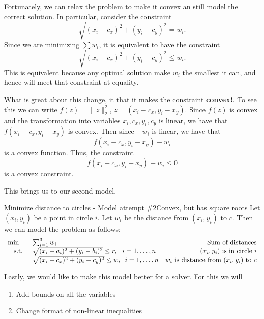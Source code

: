 Fortunately, we can relax the problem to make it convex an still model the correct solution.  In particular, consider the constraint 
$$
 \sqrt{(x_i - c_x)^2 + (y_i - c_y)^2} = w_i .
$$
Since we are minimizing $\sum w_i$, it is equivalent to have the constraint
$$
 \sqrt{(x_i - c_x)^2 + (y_i - c_y)^2} \leq w_i.
$$
This is equivalent because any optimal solution make $w_i$ the smallest it can, and hence will meet that constraint at equality.  

What is great about this change, it that it makes the constraint \textbf{convex!}. To see this we can write $f(z) = \|z\|_2^2$, $z = (x_i - c_x, y_i - x_y)$.  Since $f(z)$ is convex and the transformation into variables $x_i, c_x, y_i, c_y$ is linear, we have that $f(x_i - c_x, y_i - x_y)$ is convex.   Then since $-w_i$ is linear, we have that
$$
f(x_i - c_x, y_i - x_y) - w_i
$$
is a convex function.  Thus, the constraint 
$$
f(x_i - c_x, y_i - x_y) - w_i \leq 0 
$$
is a convex constraint.


This brings us to our second model.


\begin{general}{Minimize distance to circles - Model attempt $\#2$}{Convex, but has square roots}
Let $(x_i,y_i)$ be a point in circle $i$.  Let $w_i$ be the distance from $(x_i, y_i)$ to $c$.  Then we can  model the problem as follows:
\begin{equation}
\begin{array}{rlr}
\min \quad & \sum_{i=1}^3 w_i \hfill & \text{ Sum of distances}\\
\text{ s.t. } &  \sqrt{(x_i - a_i)^2  + (y_i - b_i)^2}  \leq r , \ \ i=1,\dots, n& \text{ $(x_i, y_i)$ is in circle $i$}\\
& \sqrt{(x_i - c_x)^2 + (y_i - c_y)^2}\leq w_i \ \ i=1, \dots, n & \text{$w_i$ is distance from $(x_i, y_i)$ to $c$}\\
\end{array}
\end{equation}
\end{general}

Lastly, we would like to make this model better for a solver.  For this we will

\begin{enumerate}
\item Add bounds on all the variables
\item Change format of non-linear inequalities
\end{enumerate}

